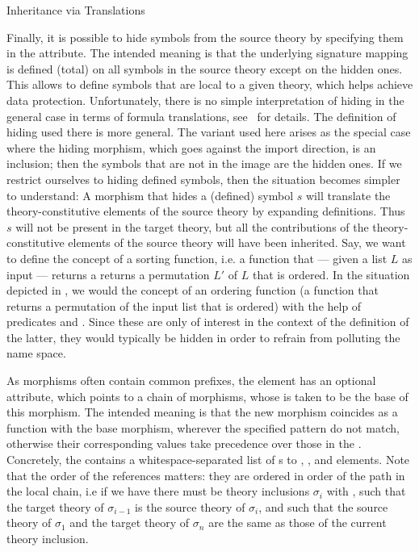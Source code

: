 \begin{omgroup}[id=complex-theories,short=Complex Theories,
                            creators=miko,contributors=frabe]
\begin{omgroup}[id=morphisms]{Inheritance via Translations}
\begin{module}[id=morphisms]
Finally, it is possible to hide symbols from the source theory by specifying them in the
 attribute. The intended meaning is that the underlying
signature mapping is defined (total) on all symbols in the source theory except on the
hidden ones. This allows to define symbols that are local to a given theory, which helps
achieve data protection. Unfortunately, there is no simple interpretation of hiding in the
general case in terms of formula translations, see~\cite{CoFI:2004:CASL-RM,MAH-06-a} for
details. The definition of hiding used there is more general. The variant used here arises
as the special case where the hiding morphism, which goes against the import direction, is
an inclusion; then the symbols that are not in the image are the hidden ones.  If we
restrict ourselves to hiding defined symbols, then the situation becomes simpler to
understand: A morphism that hides a (defined) symbol $s$ will translate the
theory-constitutive elements of the source theory by expanding definitions. Thus $s$ will
not be present in the target theory, but all the contributions of the theory-constitutive
elements of the source theory will have been inherited. Say, we want to define the concept
of a sorting function, i.e. a function that --- given a list $L$ as input --- returns a
returns a permutation $L'$ of $L$ that is ordered. In the situation depicted in
{}, we would the concept of an ordering function (a function
that returns a permutation of the input list that is ordered) with the help of predicates
{} and {}. Since these are only of interest in the context
of the definition of the latter, they would typically be hidden in order to refrain from
polluting the name space.

As morphisms often contain common prefixes, the  element has an
optional  attribute, which points to a chain of morphisms,
whose {} is taken to be the base of this morphism. The intended
meaning is that the new morphism coincides as a function with the base morphism, wherever
the specified pattern do not match, otherwise their corresponding values take precedence
over those in the {}.  Concretely, the
 contains a whitespace-separated list of
{s} to , ,
and  elements. Note that the order of the references matters: they are
ordered in order of the path in the local chain, i.e if we have
{} there must be theory inclusions
$\sigma_i$ with {}, such that the target theory
of $\sigma_{i-1}$ is the source theory of $\sigma_i$, and such that the source theory of
$\sigma_1$ and the target theory of $\sigma_n$ are the same as those of the current theory
inclusion.


\end{module}
\end{omgroup}
\end{omgroup}
